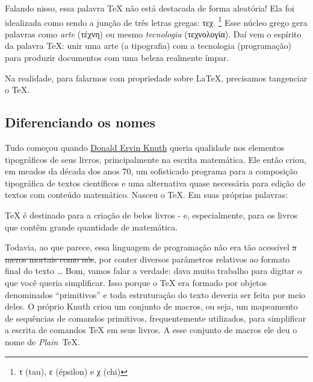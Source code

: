 
Falando nisso, essa palavra \TeX{} não está destacada de forma aleatória! 
Ela foi idealizada como sendo a junção de três letras gregas: \foreignlanguage{greek}{τεχ}.
\footnote{%
\foreignlanguage{greek}{τ} (tau), \foreignlanguage{greek}{ε} (épsilon) e \foreignlanguage{greek}{χ} (chi)
}
Esse núcleo grego gera palavras como \textit{arte} (\foreignlanguage{greek}{τέχνη}) 
ou mesmo \textit{tecnologia} (\foreignlanguage{greek}{τεχνολογία}).
Daí vem o espírito da palavra \TeX: unir uma arte (a tipografia) com a tecnologia 
(programação) para produzir documentos com uma beleza realmente ímpar.

Na realidade, para falarmos com propriedade sobre \LaTeX, precisamos tangenciar 
o \TeX.

\subsection{Diferenciando os nomes} %

Tudo começou quando \href{https://pt.wikipedia.org/wiki/Donald_Knuth}{Donald Ervin Knuth} 
queria qualidade nos elementos tipográficos de seus livros, principalmente na 
escrita matemática. 
Ele então criou, em meados da década dos anos 70, um sofisticado programa para a 
composição tipográfica de textos científicos e uma alternativa quase necessária 
para edição de textos com conteúdo matemático. 
Nasceu o \TeX. 
Em suas próprias palavras:

\begin{cita}
  \TeX{} é destinado para a criação de belos livros - e, especialmente, para os 
  livros que contêm grande quantidade de matemática.
\end{cita}

Todavia, ao que parece, essa linguagem de programação não era tão acessível 
\sout{a meros mortais como nós}, por conter diversos parâmetros relativos ao 
formato final do texto \ldots
Bom, vamos falar a verdade: dava muito trabalho para digitar o que você queria 
simplificar.
Isso porque o \TeX{} era formado por objetos denominados ``primitivos'' e toda 
estruturação do texto deveria ser feita por meio deles.
O próprio Knuth criou um conjunto de macros, ou seja, um mapeamento de sequências de comandos primitivos, frequentemente 
utilizados, para simplificar a escrita de comandos \TeX{} em seus livros.
A esse conjunto de macros ele deu o nome de \textit{Plain}~\TeX.

